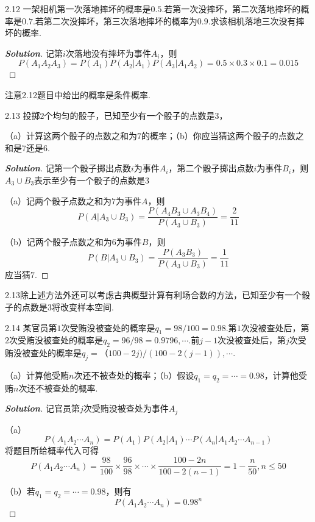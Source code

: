 \documentclass[10pt, a4paper, oneside]{ctexart}
\newenvironment{solution}{\begin{proof}[\bf Solution]}{\end{proof}}
\begin{document}
2.12 一架相机第一次落地摔坏的概率是$0.5$.若第一次没摔坏，第二次落地摔坏的概率是$0.7$.若第二次没摔坏，第三次落地摔坏的概率为$0.9$.求该相机落地三次没有摔坏的概率.
\begin{solution}
记第$i$次落地没有摔坏为事件$A_i$，则
\[P({A_1}{A_2}{A_3}) = P({A_1})P({A_2}|{A_1})P({A_3}|{A_1}{A_2}) = 0.5 \times 0.3 \times 0.1 = 0.015\]
\end{solution}
\begin{remark}
注意2.12题目中给出的概率是条件概率.
\end{remark}

2.13 投掷$2$个均匀的骰子，已知至少有一个骰子的点数是$3$，

（a）计算这两个骰子的点数之和为$7$的概率；（b）你应当猜这两个骰子的点数之和是$7$还是$6$.
\begin{solution}
记第一个骰子掷出点数$i$为事件$A_i$，第二个骰子掷出点数$i$为事件$B_i$，则$A_3\cup B_3$表示至少有一个骰子的点数是$3$

（a）记两个骰子点数之和为$7$为事件$A$，则
\[P(A|{A_3} \cup {B_3}) = \frac{{P({A_4}{B_3} \cup {A_3}{B_4})}}{{P({A_3} \cup {B_3})}} = \frac{2}{{11}}\]

（b）记两个骰子点数之和为$6$为事件$B$，则
\[P(B|{A_3} \cup {B_3}) = \frac{{P({A_3}{B_3})}}{{P({A_3} \cup {B_3})}} = \frac{1}{{11}}\]
应当猜$7$.
\end{solution}
\begin{remark}
2.13除上述方法外还可以考虑古典概型计算有利场合数的方法，已知至少有一个骰子的点数是$3$将改变样本空间.
\end{remark}

2.14 某官员第$1$次受贿没被查处的概率是$q_1=98/100=0.98$.第$1$次没被查处后，第$2$次受贿没被查处的概率是$q_2=96/98=0.9796,\cdots$.前$j-1$次没被查处后，第$j$次受贿没被查处的概率是$q_j=（100-2j)/(100-2(j-1)),\cdots$.

（a）计算他受贿$n$次还不被查处的概率；（b）假设$q_1=q_2=\cdots=0.98$，计算他受贿$n$次还不被查处的概率.
\begin{solution}
记官员第$j$次受贿没被查处为事件$A_j$

（a）
\[P({A_1}{A_2} \cdots {A_n}) = P({A_1})P({A_2}|{A_1}) \cdots P({A_n}|{A_1}{A_2} \cdots {A_{n - 1}})\]
将题目所给概率代入可得
\[P({A_1}{A_2} \cdots {A_n}) = \frac{{98}}{{100}} \times \frac{{96}}{{98}} \times  \cdots  \times \frac{{100 - 2n}}{{100 - 2(n - 1)}} = 1 - \frac{n}{{50}},n\leqslant 50\]

（b）若$q_1=q_2=\cdots=0.98$，则有
\[P({A_1}{A_2} \cdots {A_n}) = {0.98^n}\]
\end{solution}
\end{document}
